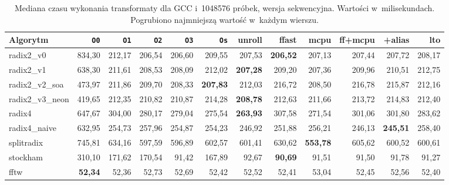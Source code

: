 \begin{table}[H]
\centering
\caption{Mediana czasu wykonania transformaty dla GCC i~1048576 próbek, wersja sekwencyjna. Wartości w~milisekundach. Pogrubiono najmniejszą wartość w~każdym wierszu.}
\label{tab:med-gcc-1M}
\scriptsize
\setlength{\tabcolsep}{3.0pt}
\begin{tabular}{lrrrrrrrrrrr}
\toprule
Algorytm & \texttt{O0} & \texttt{O1} & \texttt{O2} & \texttt{O3} & \texttt{Os} & unroll & ffast & mcpu & ff+mcpu & +alias & lto \\
\midrule
radix2\_v0 & 834,30 & 212,17 & 206,54 & 206,60 & 209,55 & 207,53 & \textbf{206,52} & 207,13 & 207,44 & 207,72 & 208,17 \\
radix2\_v1 & 638,30 & 211,61 & 208,53 & 208,09 & 212,02 & \textbf{207,28} & 209,20 & 207,36 & 209,96 & 210,51 & 212,75 \\
radix2\_v2\_soa & 473,97 & 211,86 & 209,70 & 208,33 & \textbf{207,83} & 212,03 & 216,72 & 208,50 & 216,78 & 215,87 & 212,16 \\
radix2\_v3\_neon & 419,65 & 212,35 & 210,82 & 210,87 & 214,28 & \textbf{208,78} & 212,63 & 211,66 & 213,72 & 214,83 & 212,40 \\
radix4 & 647,67 & 304,00 & 280,17 & 279,04 & 275,54 & \textbf{263,93} & 307,58 & 271,54 & 301,06 & 301,80 & 283,62 \\
radix4\_naive & 632,95 & 254,73 & 257,96 & 254,87 & 254,23 & 246,92 & 251,88 & 256,21 & 246,13 & \textbf{245,51} & 258,40 \\
splitradix & 745,81 & 634,16 & 597,59 & 596,89 & 602,57 & 601,41 & 630,62 & \textbf{553,78} & 605,62 & 600,52 & 600,61 \\
stockham & 310,10 & 171,62 & 170,54 & 91,42 & 167,89 & 92,67 & \textbf{90,69} & 91,51 & 91,50 & 91,78 & 91,27 \\
\addlinespace
fftw & \textbf{52,34} & 52,36 & 52,73 & 52,69 & 52,42 & 52,52 & 52,41 & 53,04 & 52,45 & 52,56 & 52,40 \\
\bottomrule
\end{tabular}
\end{table}



